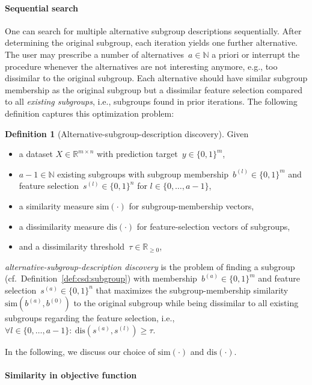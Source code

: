 \documentclass{article}
\theoremstyle{definition}
\newtheorem{definition}{Definition}
\begin{document}
\paragraph{Sequential search}

One can search for multiple alternative subgroup descriptions sequentially.
After determining the original subgroup, each iteration yields one further alternative.
The user may prescribe a number of alternatives~$a \in \mathbb{N}$ a priori or interrupt the procedure whenever the alternatives are not interesting anymore, e.g., too dissimilar to the original subgroup.
Each alternative should have similar subgroup membership as the original subgroup but a dissimilar feature selection compared to all \emph{existing subgroups}, i.e., subgroups found in prior iterations.
The following definition captures this optimization problem:
%
\begin{definition}[Alternative-subgroup-description discovery]
	Given
	\begin{itemize}[noitemsep]
		\item a dataset $X \in \mathbb{R}^{m \times n}$ with prediction target~$y \in \{0, 1\}^m$,
		\item $a-1 \in \mathbb{N}$ existing subgroups with subgroup membership~$b^{(l)} \in \{0, 1\}^m$ and feature selection~$s^{(l)} \in \{0, 1\}^n$ for $l \in \{0, \dots, a - 1\}$,
		\item a similarity measure $\text{sim}(\cdot)$ for subgroup-membership vectors,
		\item a dissimilarity measure $\text{dis}(\cdot)$ for feature-selection vectors of subgroups,
		\item and a dissimilarity threshold~$\tau \in \mathbb{R}_{\geq 0}$,
	\end{itemize}
	\emph{alternative-subgroup-description discovery} is the problem of finding a subgroup (cf.~Definition~\ref{def:csd:subgroup}) with membership~$b^{(a)} \in \{0, 1\}^m$ and feature selection~$s^{(a)} \in \{0, 1\}^n$ that maximizes the subgroup-membership similarity $\text{sim}(b^{(a)}, b^{(0)})$ to the original subgroup while being dissimilar to all existing subgroups regarding the feature selection, i.e., $\forall l \in \{0, \dots, a-1\}:~\text{dis}(s^{(a)}, s^{(l)}) \geq \tau$.
	\label{def:csd:alternative-subgroup-description-discovery}
\end{definition}
%
In the following, we discuss our choice of $\text{sim}(\cdot)$ and $\text{dis}(\cdot)$.

\paragraph{Similarity in objective function}
\end{document}
